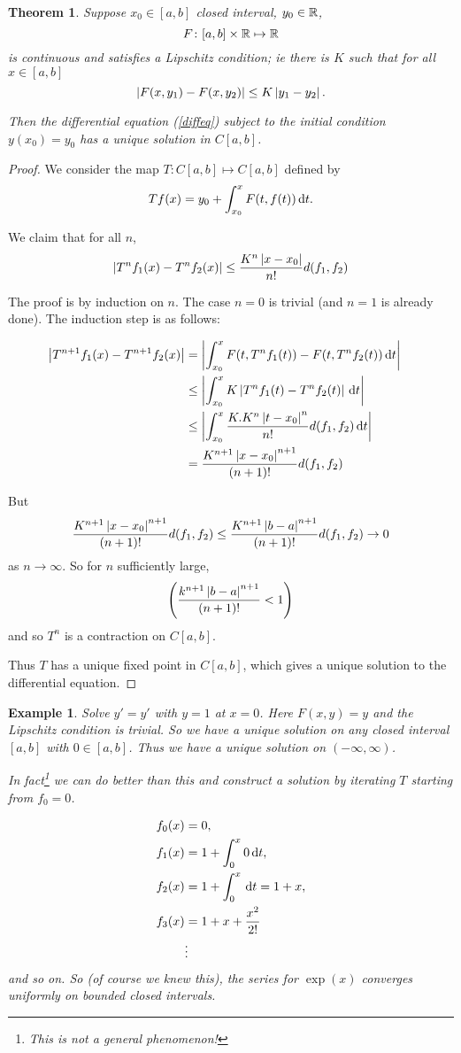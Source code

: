 \documentclass{notes}
\theoremstyle{plain}
\newtheorem{theorem}[proposition]{Theorem}
\newtheorem{example}[proposition]{Example}
\begin{document}
\begin{theorem}
Suppose $ x_{0} \in [a,b] $ closed interval, $ y_{0} \in \mathbb{R} $, \[ 
F\colon [a,b] \times \mathbb{R} \mapsto \mathbb{R} \] is continuous and satisfies a 
Lipschitz condition; ie there is $ K $ such that for all $ x \in 
[a,b] $ \[ \left|F(x,y_{1}) -F(x,y_{2})\right| \leq K \left|y_{1}-y_{2}\right|. \]

Then the differential equation (\ref{diffeq}) subject to the initial 
condition $y(x_0) = y_0$ has a unique solution in $C[a,b]$.
\end{theorem}

\begin{proof}
We consider the map $ T\colon C[a,b] \mapsto C[a,b] $ defined 
by
\[ Tf(x) = y_{0}+\int_{x_{0}}^{x}F(t,f(t))\,\mathrm{d} t. \]

We claim that for all $ n $, \[ \left|T^{n}f_{1}(x) -T^{n}f_{2}(x)\right| 
\leq \frac{K^{n} \left|x-x_{0}\right|}{n!} d(f_{1},f_{2}) \]

The proof is by induction on $ n $. The case $ n=0 $ is trivial 
(and $ n=1 $ is already done).
The induction step is as follows:

\begin{align*}
\left|T^{n+1}f_{1}(x) - T^{n+1}f_{2}(x)\right| & =
\left|\int_{x_{0}}^{x}F(t,T^{n}f_{1}(t)) - F(t,T^{n}f_{2}(t)) \,\mathrm{d} t\right| \cr
& \leq \left|\int_{x_{0}}^{x}K \left|T^{n}f_{1}(t) - T^{n}f_{2}(t)\right| 
\,\mathrm{d} t\right| \cr
& \leq \left|\int_{x_{0}}^{x}\frac{K . K^{n} \left|t-x_{0}\right|^{n}}{n!} 
d(f_{1},f_{2})\,\mathrm{d} t \right| \cr
& = \frac{K^{n+1} \left|x-x_{0}\right|^{n+1}}{(n+1)!} d(f_{1},f_{2})
\end{align*}

But \[ \frac{K^{n+1} \left|x-x_{0}\right|^{n+1}}{(n+1)!} d(f_{1},f_{2}) \leq
\frac{K^{n+1} \left|b-a\right|^{n+1}}{(n+1)!} d(f_{1},f_{2}) \to 0\] 
as $ n \to \infty $.
So for $ n $ sufficiently large,
\[
\left(\frac{k^{n+1} \left|b-a\right|^{n+1}}{(n+1)!}<1 \right)
\]
and so $ T^{n}$ is a contraction on $C[a,b]$.

Thus $T$ has a unique fixed point in $C[a,b]$, which gives a unique
solution to the differential equation.
\end{proof}

\begin{example}
Solve $y' = y'$ with $ y=1 $ at $ x=0 $.
Here $ F(x,y)=y $ and the Lipschitz condition is trivial.
So we have a unique solution on any closed interval $ [a,b] $ with $ 
0 \in [a,b] $.
Thus we have a unique solution on $ (-\infty, \infty) $.

In fact\footnote{This is not a general phenomenon!} we can do better
than this and construct a solution by
iterating $ T $ starting from $ f_{0}=0 $.

\begin{align*}
f_{0}(x)&=0,\\
f_{1}(x)&=1 + \int_0^x 0\, \mathrm{d} t,\cr
f_{2}(x)&=1+\int_{0}^{x}\,\mathrm{d} t = 1+x, \cr
f_{3}(x)&=1+x+\frac{x^{2}}{2!} \cr
&\vdots
\end{align*}
and so on.
So (of course we knew this), the series for $ \exp(x) $ converges 
uniformly on bounded closed intervals.
\end{example}
\end{document}
